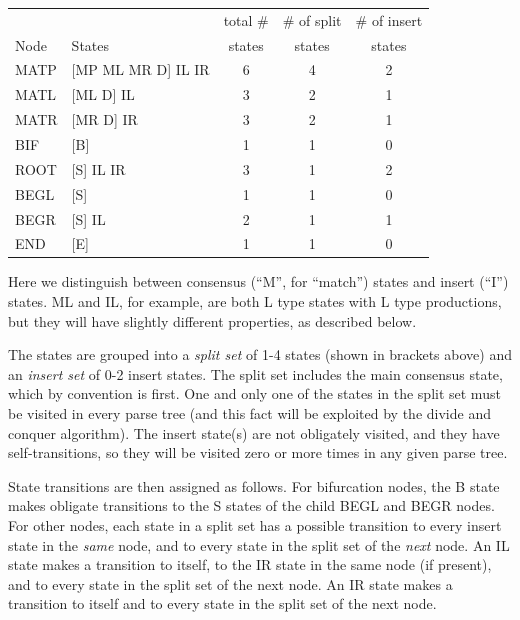 \vspace{0.5em}
\begin{center}
\begin{tabular}{llccc}
       &                     & total \#& \# of split& \# of insert\\
Node   &  States             & states  & states     & states \\ \hline
MATP   & [MP ML MR D] IL IR  &   6     &   4        &  2   \\
MATL   & [ML D] IL           &   3     &   2    &  1   \\
MATR   & [MR D] IR           &   3     &   2    &  1   \\
BIF    & [B]                 &   1     &   1    &  0   \\
ROOT   & [S] IL IR           &   3     &   1    &  2   \\
BEGL   & [S]                 &   1     &   1    &  0   \\
BEGR   & [S] IL              &   2     &   1    &  1   \\
END    & [E]                 &   1     &   1    &  0   \\ \hline
\end{tabular}
\end{center}
\vspace{0.5em}

Here we distinguish between consensus (``M'', for ``match'') states
and insert (``I'') states. ML and IL, for example, are both L type
states with L type productions, but they will have slightly different
properties, as described below.

The states are grouped into a \emph{split set} of 1-4 states (shown in
brackets above) and an \emph{insert set} of 0-2 insert states. The
split set includes the main consensus state, which by convention is
first. One and only one of the states in the split set must be visited
in every parse tree (and this fact will be exploited by the divide and
conquer algorithm). The insert state(s) are not obligately visited,
and they have self-transitions, so they will be visited zero or more
times in any given parse tree.

State transitions are then assigned as follows. For bifurcation nodes,
the B state makes obligate transitions to the S states of the child
BEGL and BEGR nodes. For other nodes, each state in a split set has a
possible transition to every insert state in the \emph{same} node, and
to every state in the split set of the \emph{next} node. An IL state
makes a transition to itself, to the IR state in the same node (if
present), and to every state in the split set of the next node. An IR
state makes a transition to itself and to every state in the split set
of the next node.

